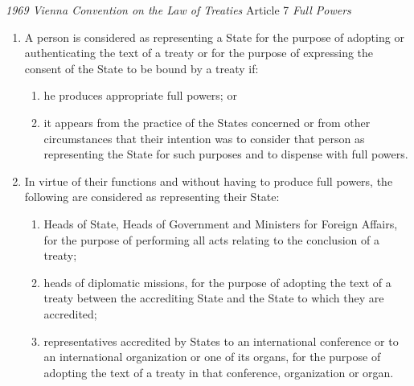\begin{conventiondetails}{\textit{1969 Vienna Convention on the Law of Treaties} Article 7}\label{VCLT Art 7}
    \flushleft
    \textit{Full Powers}
    \begin{enumerate}
        \item A person is considered as representing a State for the purpose of adopting or authenticating the text of a treaty or for the purpose of expressing the consent of the State to be bound by a treaty if: 
        \begin{enumerate}[label=(\alph*)]
            \item he produces appropriate full powers; or 
            \item it appears from the practice of the States concerned or from other circumstances that their  intention was to consider that person as representing the State for such purposes and to dispense with full powers. 
        \end{enumerate}
        \item In virtue of their functions and without having to produce full powers, the following are  considered as representing their State:
        \begin{enumerate}[label=(\alph*)]
            \item Heads of State, Heads of Government and Ministers for Foreign Affairs, for the purpose of 
            performing all acts relating to the conclusion of a treaty; 
            \item heads of diplomatic missions, for the purpose of adopting the text of a treaty between the accrediting State and the State to which they are accredited; 
            \item representatives accredited by States to an international conference or to an international organization or one of its organs, for the purpose of adopting the text of a treaty in that conference, organization or organ. 
        \end{enumerate}
    \end{enumerate}
\end{conventiondetails}

